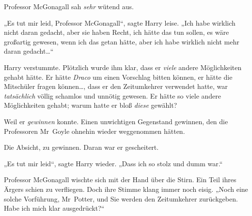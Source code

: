 Professor McGonagall sah \emph{sehr} wütend aus.

„Es tut mir leid, Professor McGonagall“, sagte Harry leise. „Ich habe wirklich nicht daran gedacht, aber sie haben Recht, ich hätte das tun sollen, es wäre großartig gewesen, wenn ich das getan hätte, aber ich habe wirklich nicht mehr daran gedacht…“

Harry verstummte. Plötzlich wurde ihm klar, dass er \emph{viele} andere Möglichkeiten gehabt hätte. Er hätte \emph{Draco} um einen Vorschlag bitten können, er hätte die Mitschüler fragen können…, dass er den Zeitumkehrer verwendet hatte, war \emph{tatsächlich} völlig schamlos und unnötig gewesen. Er hätte so viele andere Möglichkeiten gehabt; warum hatte er bloß \emph{diese} gewählt?

Weil er \emph{gewinnen} konnte. Einen unwichtigen Gegenstand gewinnen, den die Professoren Mr~Goyle ohnehin wieder weggenommen hätten.

Die Absicht, zu gewinnen. Daran war er gescheitert.

„Es tut mir leid“, sagte Harry wieder. „Dass ich so stolz und dumm war.“

Professor McGonagall wischte sich mit der Hand über die Stirn. Ein Teil ihres Ärgers schien zu verfliegen. Doch ihre Stimme klang immer noch eisig. „Noch eine solche Vorführung, Mr~Potter, und Sie werden den Zeitumkehrer zurückgeben. Habe ich mich klar ausgedrückt?“

